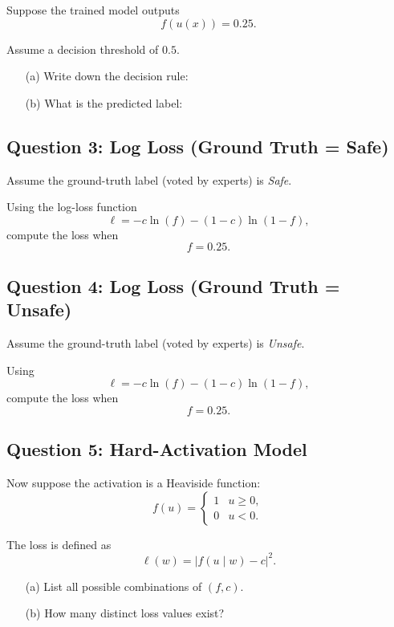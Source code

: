 \documentclass[12pt]{article}
\begin{document}
Suppose the trained model outputs
\[
f(u(x)) = 0.25.
\]

Assume a decision threshold of $0.5$.

\begin{enumerate}
    \item[(a)] Write down the decision rule: \FillRule{2in}
    \item[(b)] What is the predicted label: \FillRule{1in}
\end{enumerate}

\subsection*{Question 3: Log Loss (Ground Truth = Safe)}

Assume the ground-truth label (voted by experts) is \textit{Safe}.

Using the log-loss function
\[
\ell = -c \ln(f) - (1-c)\ln(1-f),
\]
compute the loss when
\[
f = 0.25.
\]

\FillRule{5in}

\FillRule{5in}

\subsection*{Question 4: Log Loss (Ground Truth = Unsafe)}

Assume the ground-truth label (voted by experts) is \textit{Unsafe}.

Using
\[
\ell = -c \ln(f) - (1-c)\ln(1-f),
\]
compute the loss when
\[
f = 0.25.
\]

\FillRule{5in}

\FillRule{5in}

\subsection*{Question 5: Hard-Activation Model}

Now suppose the activation is a Heaviside function:
\[
f(u) =
\begin{cases}
1 & u \ge 0, \\
0 & u < 0.
\end{cases}
\]

The loss is defined as
\[
\ell(w) = |f(u\mid w) - c|^2.
\]

\begin{enumerate}
    \item[(a)] List all possible combinations of $(f, c)$. 

    \FillRule{5in}
    \item[(b)] How many distinct loss values exist? \FillRule{1in}
\end{enumerate}
\end{document}
